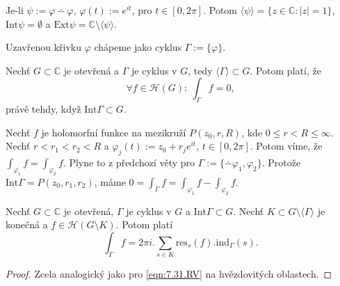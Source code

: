 \begin{example}
Je-li $\psi:=\varphi\dotminus\varphi$, $\varphi(t):=e^{it}$, pro $t\in[0,2\pi]$. Potom $\langle\psi\rangle=\{z\in\mathbb{C}: |z|=1\}$, $\text{Int}\psi=\emptyset$ a $\text{Ext}\psi=\mathbb{C}\setminus\langle\psi\rangle$.
\end{example}

\begin{note}
Uzavřenou křivku $\varphi$ chápeme jako cyklus $\Gamma:=\{\varphi\}$.
\end{note}

\begin{theorem}
Nechť $G\subset\mathbb{C}$ je otevřená a $\Gamma$ je cyklus v $G$, tedy $\langle\Gamma\rangle\subset G$. Potom platí, že
\begin{equation}
    \forall f\in\mathcal{H}(G):\ \int_\Gamma f =0,
    \tag{CV}
    \label{eqn:7.30.cv}
\end{equation}
právě tehdy, když $\text{Int}\Gamma\subset G$.
\end{theorem}

\begin{example}
Nechť $f$ je holomorfní funkce na mezikruží $P(z_0,r,R)$, kde $0\leq r<R\leq\infty$. Nechť $r<r_1<r_2<R$ a $\varphi_j(t):=z_0+r_je^{it}$, $t\in[0,2\pi]$. Potom víme, že $\int_{\varphi_1}f=\int_{\varphi_2}f$. Plyne to z předchozí věty pro $\Gamma:=\{\dotminus\varphi_1,\varphi_2\}$. Protože $\text{Int}\Gamma=P(z_0,r_1,r_2)$, máme $0=\int_\Gamma f = \int_{\varphi_1}f-\int_{\varphi_2}f$.
\end{example}

\begin{theorem}
Nechť $G\subset\mathbb{C}$ je otevřená, $\Gamma$ je cyklus v $G$ a $\text{Int}\Gamma\subset G$. Nechť $K\subset G\setminus\langle\Gamma\rangle$ je konečná  a $f\in\mathcal{H}(G\setminus K)$. Potom platí
\begin{equation}
    \int_\Gamma f = 2\pi i . \sum_{s\in K}\text{res}_s(f).\text{ind}_\Gamma(s).
    \tag{RVC}
    \label{eqn:9.8.rvc}
\end{equation}
\end{theorem}
\begin{proof}
Zcela analogický jako pro \cref{eqn:7.31.RV} na hvězdovitých oblastech.
\end{proof}